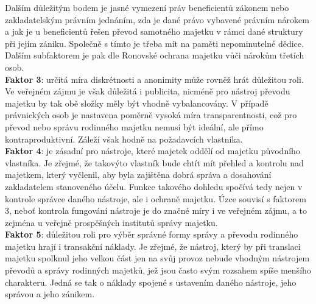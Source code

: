 \documentclass{article}
\begin{document}

Dalším důležitým bodem je jasné vymezení práv beneficientů zákonem nebo zakladatelským právním jednáním, zda je dané právo vybavené právním nárokem a jak je u beneficientů řešen převod samotného majetku v rámci dané struktury při jejím zániku. Společně s tímto je třeba mít na paměti nepominutelné dědice.\\


Dalším subfaktorem je pak dle Ronovské ochrana majetku vůči nárokům třetích osob.\\

\textbf{Faktor 3}: určitá míra diskrétnosti a anonimity může rovněž hrát důležitou roli. Ve veřejném zájmu je však důležitá i publicita, nicméně pro nástroj převodu majetku by tak obě složky měly být vhodně vybalancovány. V případě právnických osob je nastavena poměrně vysoká míra transparentnosti, což pro převod nebo správu rodinného majetku nemusí být ideální, ale přímo kontraproduktivní. Záleží však hodně na požadavcích vlastníka.\\

\textbf{Faktor 4}: je zásadní pro nástroje, které majetek oddělí od majetku původního vlastníka. Je zřejmé, že takovýto vlastník bude chtít mít přehled a kontrolu nad majetkem, který vyčlenil, aby byla zajištěna dobrá správa a dosahování zakladatelem stanoveného účelu. Funkce takového dohledu spočívá tedy nejen v kontrole správce daného nástroje, ale i ochraně majetku. Úzce souvisí s faktorem 3, neboť kontrola fungování nástroje je do značné míry i ve veřejném zájmu, a to zejména u veřejně prospěšných institutů správy majetku.\\

\textbf{Faktor 5}: důležitou roli pro výběr správné formy správy a převodu rodinného majetku hrají i transakční náklady. Je zřejmé, že nástroj, který by při translaci majetku spolknul jeho velkou část jen na svůj provoz nebude vhodným nástrojem převodů a správy rodinných majetků, jež jsou často svým rozsahem spíše menšího charakteru. Jedná se tak o náklady spojené s ustavením daného nástroje, jeho správou a jeho zánikem.\\
\end{document}
